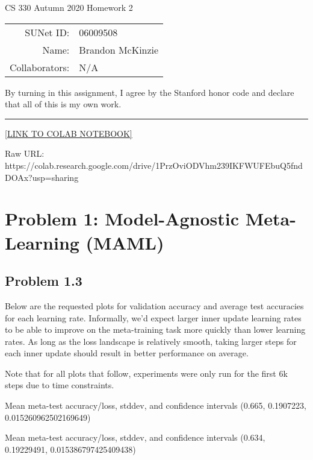 \documentclass[11pt]{article}
\begin{document}
\begin{center}
	{\Large CS 330 Autumn 2020 Homework 2}
	
	\begin{tabular}{rl}
		SUNet ID: & 06009508 \\
		Name: & Brandon McKinzie \\
		Collaborators: & N/A
	\end{tabular}
\end{center}

\p By turning in this assignment, I agree by the Stanford honor code and declare
that all of this is my own work.

\rule{\linewidth}{0.4pt}

\href{https://colab.research.google.com/drive/1PrzOviODVhm239IKFWUFEbuQ5fndDOAx?usp=sharing}{[LINK TO COLAB NOTEBOOK]}

Raw URL: https://colab.research.google.com/drive/1PrzOviODVhm239IKFWUFEbuQ5fndDOAx?usp=sharing


\myspace 
\section*{Problem 1: Model-Agnostic Meta-Learning (MAML)}

\subsection*{Problem 1.3}

Below are the requested plots for validation accuracy and average test accuracies for each learning rate. Informally, we'd expect larger inner update learning rates to be able to improve on the meta-training task more quickly than lower learning rates. As long as the loss landscape is relatively smooth, taking larger steps for each inner update should result in better performance on average. 

Note that for all plots that follow, experiments were only run for the first 6k steps due to time constraints.


Mean meta-test accuracy/loss, stddev, and confidence intervals
(0.665, 0.1907223, 0.015260962502169649)

\vspace*{5em}


Mean meta-test accuracy/loss, stddev, and confidence intervals
(0.634, 0.19229491, 0.015386797425409438)
\end{document}
